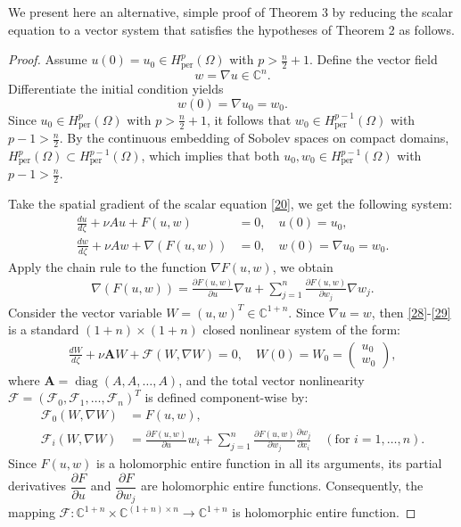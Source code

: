 \documentclass[12pt]{article}
\theoremstyle{plain}
\theoremstyle{remark}
\begin{document}
We present here an alternative, simple proof of Theorem 3 by reducing the scalar equation to a vector system that satisfies the hypotheses of Theorem 2 as follows.

\begin{proof}
Assume $u(0)=u_0 \in H^p_{\text{per}}(\Omega)$ with $p > \frac{n}{2} + 1$. Define the vector field \[w = \nabla u \in \mathbb{C}^n.\] Differentiate the initial condition yields \[w(0) = \nabla u_0 = w_0.\] Since $u_0 \in H^p_{\text{per}}(\Omega)$ with $p > \frac{n}{2} + 1$, it follows that $w_0 \in H^{p-1}_{\text{per}}(\Omega)$ with $p-1 > \frac{n}{2}$. By the continuous embedding of Sobolev spaces on compact domains, $H^p_{\text{per}}(\Omega) \subset H^{p-1}_{\text{per}}(\Omega)$, which implies that both $u_0, w_0 \in H^{p-1}_{\text{per}}(\Omega)$ with $p-1 > \frac{n}{2} $.

Take the spatial gradient of the scalar equation \eqref{20}, we get the following system:
\begin{align}
    \frac{du}{d\zeta} + \nu Au + F(u,w) &= 0,\quad u(0)=u_0, \label{28} \\
    \frac{dw}{d\zeta} + \nu Aw + \nabla ( F(u,w)) &= 0,\quad w(0)=\nabla u_0=w_0
    .\label{29}
\end{align}
Apply the  chain rule to the function $\nabla F(u, w)$, we obtain 
\begin{align}
    \nabla ( F(u,w)) = \frac{\partial F(u,w)}{\partial u} \nabla u + \sum_{j=1}^n \frac{\partial F(u,w)}{\partial w_j} \nabla w_j.\label{30}
\end{align}
Consider the vector variable $W = (u, w)^T \in \mathbb{C}^{1+n}$. Since $\nabla u = w$, then \eqref{28}-\eqref{29} is a standard $(1+n) \times (1+n)$ closed nonlinear system of the form:
\begin{align}
    \frac{dW}{d\zeta} + \nu \mathbf{A}W + \mathcal{F}(W, \nabla W) = 0, \quad W(0) = W_0 = \begin{pmatrix} u_0 \\ w_0 \end{pmatrix},\label{31}
\end{align}
where $\mathbf{A} = \operatorname{diag}(A, A, \dots, A)$, and the total vector nonlinearity $\mathcal{F} = (\mathcal{F}_0, \mathcal{F}_1, \dots, \mathcal{F}_n)^T$ is defined component-wise by:
\begin{align}
    \mathcal{F}_0(W, \nabla W) &= F(u,w), \label{32}\\
    \mathcal{F}_i(W, \nabla W) &= \frac{\partial F(u,w)}{\partial u} w_i + \sum_{j=1}^n \frac{\partial F(u,w)}{\partial w_j} \frac{\partial w_j}{\partial x_i} \quad (\text{for } i=1,\dots,n).\label{33}
\end{align}
Since $F(u,w)$ is a holomorphic entire function in all its arguments, its partial derivatives $\dfrac{\partial F}{\partial u}$ and $\dfrac{\partial F}{\partial w_j}$ are holomorphic entire functions. Consequently, the mapping $\mathcal{F}: \mathbb{C}^{1+n} \times \mathbb{C}^{(1+n) \times n} \to \mathbb{C}^{1+n}$ is holomorphic entire function.


\end{proof}
\end{document}
